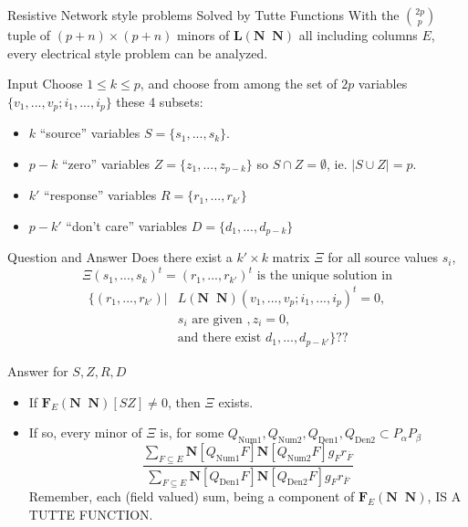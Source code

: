 \documentclass{beamer}
\newcommand{\ext}[1]{\ensuremath{\mathbf{#1}}}
\begin{document}
\begin{frame}{Resistive Network style problems Solved by Tutte Functions}
  With the $\binom{2p}{p}$ tuple of $(p+n)\times(p+n)$
  minors of $\ext{L}(\ext{N}\;\;\ext{N})$ all including columns $E$, every electrical style
  problem can be analyzed.
  \begin{block}{Input}
    Choose $1\le k\le p$, and choose from among the set of $2p$ variables
    $\{v_1,...,v_p;i_1,...,i_p\}$ these 4 subsets:
    \begin{itemize}
    \item $k$ ``source'' variables $S=\{s_1,...,s_k\}$.
    \item $p-k$ ``zero'' variables $Z=\{z_1,...,z_{p-k}\}$ so $S\cap Z=\emptyset$, ie. $|S\cup Z|=p$.
    \item $k'$ ``response'' variables $R=\{r_1,...,r_{k'}\}$
    \item $p-k'$ ``don't care'' variables $D=\{d_1,...,d_{p-k}\}$ 
    \end{itemize}
  \end{block}
\end{frame}

\begin{frame}{Question and Answer}
    Does there exist a $k'\times k$ matrix $\Xi$ for all source values $s_i$,
    \[
    \Xi(s_1,...,s_k)^t = (r_1,...,r_{k'})^t \text{\ is the unique solution in}
    \]
    \[
    \begin{split}    \{ (r_1,...,r_{k'}) |& L( \ext{N}\;\;\ext{N} )(v_1,...,v_p;i_1,...,i_p)^t = 0,\\
      & s_i \text{\ are given\ }, z_i=0,\\
      &\text{and there exist\ } d_1,...,d_{p-k'}\}??
    \end{split}
    \]
  \begin{block}{Answer for $S,Z,R,D$}
    \begin{itemize}
     \item
        If $\ext{F}_E(\ext{N}\;\;\ext{N})[SZ]\not=0$, then $\Xi$ exists.

      \item
        If so, every minor of $\Xi$ is, for some
        $Q_{\text{Num1}},Q_{\text{Num2}},Q_{\text{Den1}},Q_{\text{Den2}}\subset P_\alpha P_\beta$
        \[
        \frac{\sum_{F\subseteq E}\ext{N}[Q_{\text{Num1}}F]\ext{N}[Q_{\text{Num2}}F]g_Fr_{\overline{F}}}
          {\sum_{F\subseteq E}\ext{N}[Q_{\text{Den1}}F]\ext{N}[Q_{\text{Den2}}F]g_Fr_{\overline{F}}}
          \]
          Remember, each (field valued) sum, being a component of
          $\ext{F}_E(\ext{N}\;\;\ext{N})$,  IS A TUTTE FUNCTION.
    \end{itemize}
  \end{block}
\end{frame}
          
\end{document}
